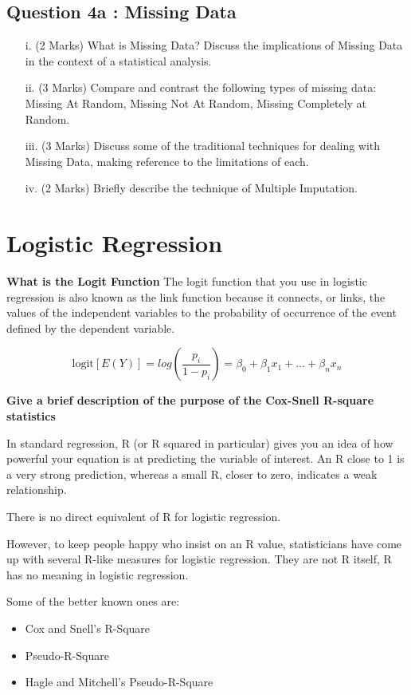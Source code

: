 \documentclass[a4paper,12pt]{article}
\begin{document}
\subsection*{Question 4a : Missing Data}%
\begin{itemize}
	\item[i.](2 Marks) What is Missing Data? Discuss the implications of Missing Data in the context of a statistical analysis.
	\item[ii.](3 Marks) Compare and contrast the following types of missing data: Missing At Random, Missing Not At Random, Missing Completely at Random.
	\item[iii.](3 Marks) Discuss some of the traditional techniques for dealing with Missing Data, making reference to the limitations of each.
	\item[iv.](2 Marks) Briefly describe the technique of Multiple Imputation.
\end{itemize}
\newpage
\section{Logistic Regression}
\textbf{What is the Logit Function}
The logit function that you use in logistic regression is also known as the link function because it connects, or links, the values of the independent variables to the probability of occurrence of the event defined by the dependent variable.

\[ \mbox{logit}[E(Y)] = log(\frac{p_i}{1-p_i}) = \beta_0 + \beta_1x_1 + \ldots + \beta_nx_n \]


\textbf{Give a brief description of the purpose of the Cox-Snell R-square statistics}

In standard regression, R (or R squared in particular) gives you an idea of how powerful your equation is at predicting the variable of interest. An R close to 1 is a very strong prediction, whereas a small R, closer to zero, indicates a weak relationship.

There is no direct equivalent of R for logistic regression.

However, to keep people happy who insist on an R value, statisticians have come up with several R-like measures for logistic regression. They are not R itself, R has no meaning in logistic regression.

Some of the better known ones are:

\begin{itemize}
\item Cox and Snell's R-Square
\item Pseudo-R-Square
\item Hagle and Mitchell's Pseudo-R-Square
\end{itemize}
\newpage
\end{document}
